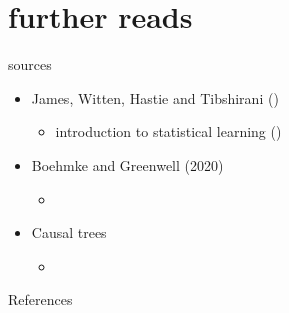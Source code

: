 \documentclass[aspectratio=169]{beamer}
\begin{document}
\section{further reads}

	\begin{frame}{sources}
		\begin{itemize}
			\item James, Witten, Hastie and Tibshirani (\citeyear{James2013})
			\begin{itemize}
				\item introduction to statistical learning (\href{https://www.edx.org/course/statistical-learning}{\underline{}})
			\end{itemize}
			\item Boehmke and Greenwell (2020)
			\begin{itemize}
				\item \href{https://bradleyboehmke.github.io/HOML/}{\underline{}}
			\end{itemize}
			\item Causal trees
			\begin{itemize}
				\item \href{https://grf-labs.github.io/grf/}{\underline{}}
			\end{itemize}
		\end{itemize}
	\end{frame}



	\begin{frame}[t, allowframebreaks]{References}
	  \printbibliography
	\end{frame}

%
\end{document}
